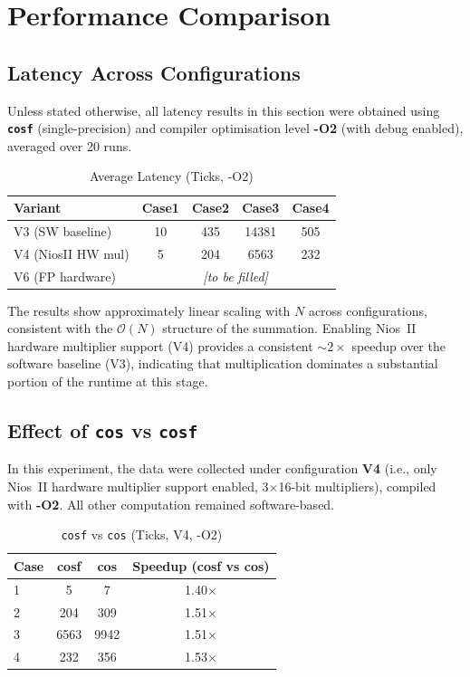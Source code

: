 \section{Performance Comparison}

\subsection{Latency Across Configurations}

Unless stated otherwise, all latency results in this section were obtained using \textbf{\texttt{cosf}} (single-precision) and compiler optimisation level \textbf{-O2} (with debug enabled), averaged over 20 runs. 

\begin{table}[H]
\centering
\caption{Average Latency (Ticks, -O2)}
\begin{tabular}{lcccc}
\toprule
Variant & Case1 & Case2 & Case3 & Case4 \\
\midrule
V3 (SW baseline) & 10    & 435   & 14381 & 505 \\
V4 (NiosII HW mul) & 5     & 204   & 6563  & 232 \\
V6 (FP hardware) & \multicolumn{4}{c}{\textit{[to be filled]}} \\
\bottomrule
\end{tabular}
\end{table}

The results show approximately linear scaling with $N$ across configurations, consistent with the $\mathcal{O}(N)$ structure of the summation. 
Enabling Nios~II hardware multiplier support (V4) provides a consistent $\sim 2\times$ speedup over the software baseline (V3), indicating that multiplication dominates a substantial portion of the runtime at this stage.

\subsection{Effect of \texttt{cos} vs \texttt{cosf}}

In this experiment, the data were collected under configuration \textbf{V4} (i.e., only Nios~II hardware multiplier support enabled, 3$\times$16-bit multipliers), compiled with \textbf{-O2}. 
All other computation remained software-based.

\begin{table}[H]
\centering
\caption{\texttt{cosf} vs \texttt{cos} (Ticks, V4, -O2)}
\begin{tabular}{lccc}
\toprule
Case & cosf & cos & Speedup (cosf vs cos) \\
\midrule
1 & 5    & 7    & 1.40$\times$ \\
2 & 204  & 309  & 1.51$\times$ \\
3 & 6563 & 9942 & 1.51$\times$ \\
4 & 232  & 356  & 1.53$\times$ \\
\bottomrule
\end{tabular}
\end{table}

